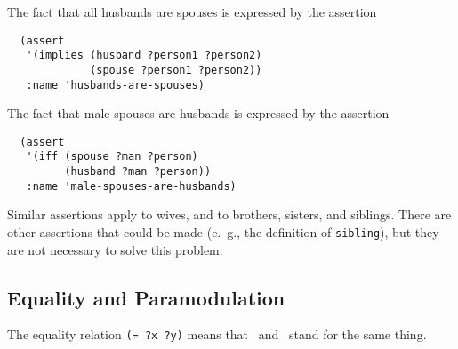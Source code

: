 The fact that all husbands are spouses is expressed by the assertion
\begin{verbatim}
  (assert
   '(implies (husband ?person1 ?person2)
             (spouse ?person1 ?person2))
   :name 'husbands-are-spouses)
\end{verbatim}

The fact that male spouses are husbands is expressed by the assertion
\begin{verbatim}
  (assert
   '(iff (spouse ?man ?person)
         (husband ?man ?person))
   :name 'male-spouses-are-husbands)
\end{verbatim}
Similar assertions apply to wives, and to
brothers, sisters, and siblings.  There are other assertions that
could be made (e.\  g., the definition of {\tt sibling}), but they are
not necessary to solve this problem.


\subsection{Equality and Paramodulation}
\label{subsec-equality-and-paramodulation}

The equality relation \verb'(= ?x ?y)' means that \varx\  and \vary\
stand for the same thing.

